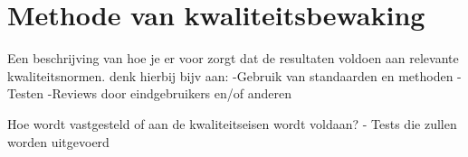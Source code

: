 \chapter{Methode van kwaliteitsbewaking}
Een beschrijving van hoe je er voor zorgt dat de resultaten voldoen aan relevante kwaliteitsnormen.
denk hierbij bijv aan: 
-Gebruik van standaarden en methoden
-Testen
-Reviews door eindgebruikers en/of anderen

Hoe wordt vastgesteld of aan de kwaliteitseisen wordt voldaan?
-
Tests die zullen worden uitgevoerd